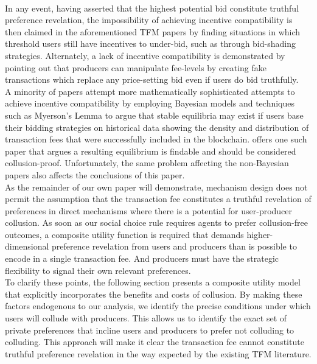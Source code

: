 \documentclass[11pt,a4paper]{llncs}
\begin{document}
\vspace{0.2cm} \\
In any event, having asserted that the highest potential bid constitute truthful preference revelation, the impossibility of achieving incentive compatibility is then claimed in the aforementioned TFM papers by finding situations in which threshold users still have incentives to under-bid, such as through bid-shading strategies. Alternately, a lack of incentive compatibility is demonstrated by pointing out that producers can manipulate fee-levels by creating fake transactions which replace any price-setting bid even if users do bid truthfully.
\vspace{0.2cm} \\
A minority of papers attempt more mathematically sophisticated attempts to achieve incentive compatibility by employing Bayesian models and techniques such as Myerson's Lemma to argue that stable equilibria may exist if users base their bidding strategies on historical data showing the density and distribution of transaction fees that were successfully included in the blockchain. \cite{chen2022bayesian} offers one such paper that argues a resulting equilibrium is findable and should be considered collusion-proof. Unfortunately, the same problem affecting the non-Bayesian papers also affects the conclusions of this paper.
\vspace{0.2cm} \\
As the remainder of our own paper will demonstrate, mechanism design does not permit the assumption that the transaction fee constitutes a truthful revelation of preferences in direct mechanisms where there is a potential for user-producer collusion. As soon as our social choice rule requires agents to prefer collusion-free outcomes, a composite utility function is required that demands higher-dimensional preference revelation from users and producers than is possible to encode in a single transaction fee. And producers must have the strategic flexibility to signal their own relevant preferences.
\vspace{0.2cm} \\
To clarify these points, the following section presents a composite utility model that explicitly incorporates the benefits and costs of collusion. By making these factors endogenous to our analysis, we identify the precise conditions under which users will collude with producers. This allows us to identify the exact set of private preferences that incline users and producers to prefer not colluding to colluding. This approach will make it clear the transaction fee cannot constitute truthful preference revelation in the way expected by the existing TFM literature.
\end{document}
